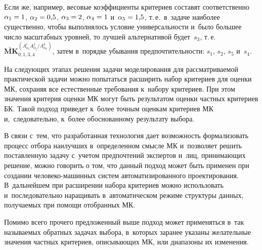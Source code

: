 \begin{multicols}{2}
   Если же, например, весовые коэффициенты критериев составят 
соответственно
   $\alpha_1\hm=1$, $\alpha_2\hm=0{,}5$, $\alpha_3\hm=2$, 
   $\alpha_4\hm=1$ и~$\alpha_5\hm=1{,}5$,
т.\,е.\ в~задаче наиболее существенно, чтобы выполнялось условие 
универсальности и~было большее чис\-ло мас\-штаб\-ных уровней, то лучшей 
альтернативой будет~$s_3$, т.\,е.\ 
$\widetilde{\mathbf{MK}}_{0,1,3,4}^{(A^i_{\alpha_i}A^j_{\alpha_j}/ 
A^k_{\alpha_k})}$, затем в~порядке убывания предпочтительности: $s_1$, $s_2$, 
$s_5$ и~$s_4$.

   На следующих этапах решения задачи моделирования для рассматриваемой 
практической задачи можно попытаться расширить набор критериев для оценки 
МК, сохраняя все естественные требования к~набору критериев. При этом 
значения критерия оценки МК могут быть результатом оценки част\-ных критериев 
БК. Такой подход приведет к~более точным оценкам критериев МК 
и,~следовательно, к~более обоснованному результату выбора.
   
   В связи с~тем, что разработанная технология дает возможность формализовать 
процесс отбора наилучших в~определенном смысле МК и~позволяет решить 
поставленную задачу с~учетом предпочтений экспертов и~лиц, принимающих 
решение, можно говорить о том, что данный подход может быть применен при 
создании че\-ло\-ве\-ко-ма\-шин\-ных сис\-тем автоматизированного 
проектирования. В~дальнейшем при расширении набора критериев можно 
использовать и~последовательно наращивать в~автоматическом режиме 
структуры данных, по\-лу\-ча\-емых при помощи отобранных МК.
   
   Помимо всего прочего предложенный выше подход может применяться в~так 
называемых обратных задачах выбора, в~которых заранее указаны желательные 
значения частных критериев, описывающих МК, или диапазоны их изменения.
   

\end{multicols}
